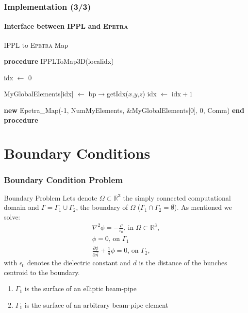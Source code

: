 \documentclass[xcolor=pdftex,table,10pt]{beamer}
\renewcommand {\Re}{{\mathbb{R}}}
\begin{document}
	\begin{frame}
		\frametitle{Implementation (3/3)}
		\framesubtitle{Interface between \textsc{IPPL} and \textsc{Epetra}}

		\begin{block}{\textsc{IPPL} to \textsc{Epetra} Map}
		\begin{algorithmic}[1]
			\STATE \textbf{procedure} IPPLToMap3D(localidx)

			\STATE idx $\leftarrow$ 0

						\STATE MyGlobalElements[idx] $\leftarrow$ bp$\rightarrow$getIdx($x$,$y$,$z$)
						\STATE idx $\leftarrow$ $\text{idx} + 1$
					\ENDFOR
				\ENDFOR
			\ENDFOR
			
			\RETURN \textbf{new} Epetra\_Map(-1, NumMyElements, \&MyGlobalElements[0], 0, Comm)
			\STATE \textbf{end procedure}
  		\end{algorithmic}
		\end{block}

	\end{frame}


    \section{Boundary Conditions}
	
	\begin{frame}
		\frametitle{Boundary Condition Problem}

		\begin{block}{Boundary Problem}
		Lets denote $\Omega \subset \Re^3$ the simply connected computational domain and $\Gamma= \Gamma_1 \cup \Gamma_2$, the boundary of $\Omega$ ($\Gamma_1 \cap \Gamma_2 = \emptyset$). As mentioned we solve:
		\begin{eqnarray*}
			\nabla^2 \phi = -\frac{\rho}{\epsilon_0} \text{, in } \Omega \subset \Re^3 , \nonumber \\
			\phi = 0 \text{, on }\Gamma_1   \\
			\frac{\partial \phi}{\partial \vec{n}} + \frac {1}{d} \phi = 0  \text{, on } \Gamma_2\text{,}
		\end{eqnarray*}
		with $\epsilon_0$ denotes the dielectric constant and $d$ is the distance of the bunches centroid to the  boundary.
		\end{block}
		
		\pause
		\vspace{0.3cm}
		\begin{enumerate}
			\item $\Gamma_1$ is the surface of an elliptic beam-pipe
			\item $\Gamma_1$ is the surface of an arbitrary beam-pipe element
		\end{enumerate}
	
	\end{frame}
	
\end{document}
